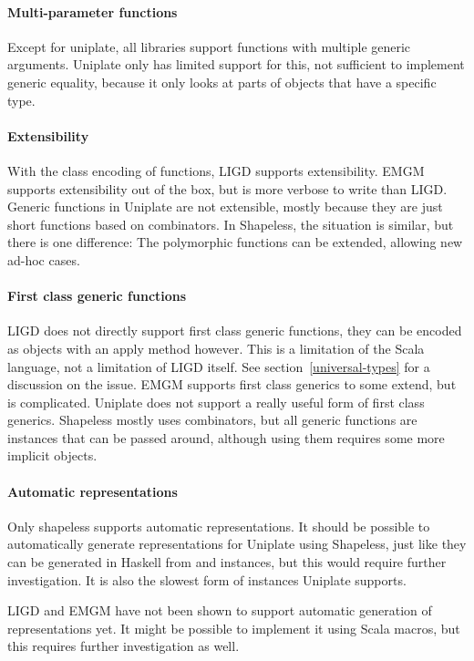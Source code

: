 \paragraph{Multi-parameter functions}
Except for uniplate, all libraries support functions with multiple generic
arguments. Uniplate only has limited support for this, not sufficient to
implement generic equality, because it only looks at parts of objects that
have a specific type.

\paragraph{Extensibility}
With the class encoding of functions, LIGD supports
extensibility. EMGM supports extensibility out of the box, but is more verbose
to write than LIGD. Generic functions in Uniplate are not extensible, mostly
because they are just short functions based on combinators. In Shapeless, the
situation is similar, but there is one difference: The polymorphic functions
can be extended, allowing new ad-hoc cases.

\paragraph{First class generic functions}
LIGD does not directly support first class generic functions, they can be encoded as
objects with an apply method however. This is a limitation of the Scala
language, not a limitation of LIGD itself. See section~\ref{universal-types}
for a discussion on the issue. EMGM supports first class generics to some
extend, but is complicated. Uniplate does not support a really useful form
of first class generics. Shapeless mostly uses combinators, but
all generic functions are  instances that can be passed around,
although using them requires some more implicit objects.

\paragraph{Automatic representations}
Only shapeless supports automatic representations. It should be possible to
automatically generate representations for Uniplate using Shapeless,
just like they can be generated in Haskell from  and 
instances, but this would require further investigation. It is also the slowest
form of instances Uniplate supports.

LIGD and EMGM have not been shown to support automatic generation of
representations yet. It might be possible to implement it using Scala
macros, but this requires further investigation as well.

